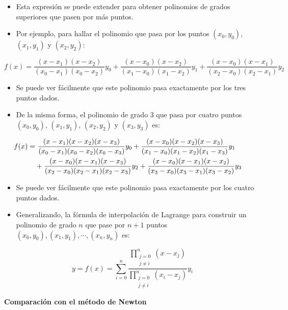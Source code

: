 \documentclass[openany]{book}
\providecommand{\tightlist}{%
  \setlength{\itemsep}{0pt}\setlength{\parskip}{0pt}}
\begin{document}
\begin{itemize}
\tightlist
\item
  Esta expresión se puede extender para obtener polinomios de grados superiores que pasen por más puntos.
\item
  Por ejemplo, para hallar el polinomio que pasa por los puntos \((x_0, y_0)\), \((x_1, y_1)\) y \((x_2, y_2)\):
\end{itemize}

\[
f(x) = \frac{(x - x_1)(x - x_2)}{(x_0 - x_1)(x_0 - x_2)} y_0 + \frac{(x - x_0)(x - x_2)}{(x_1 - x_0)(x_1 - x_2)} y_1 + \frac{(x - x_0)(x - x_1)}{(x_2 - x_0)(x_2 - x_1)} y_2
\]

\begin{itemize}
\item
  Se puede ver fácilmente que este polinomio pasa exactamente por los tres puntos dados.
\item
  De la misma forma, el polinomio de grado 3 que pasa por cuatro puntos \((x_0, y_0)\), \((x_1, y_1)\), \((x_2, y_2)\) y \((x_3, y_3)\) es:
\end{itemize}

\[
\hspace{-0.5cm}
\begin{split}
f(x) = &~ \frac{(x - x_1)(x - x_2)(x - x_3)}{(x_0 - x_1)(x_0 - x_2)(x_0 - x_3)} y_0 + \frac{(x - x_0)(x - x_2)(x - x_3)}{(x_1 - x_0)(x_1 - x_2)(x_1 - x_3)} y_1 \\
& + \frac{(x - x_0)(x - x_1)(x - x_3)}{(x_2 - x_0)(x_2 - x_1)(x_2 - x_3)} y_2 + \frac{(x - x_0)(x - x_1)(x - x_2)}{(x_3 - x_0)(x_3 - x_1)(x_3 - x_2)} y_3
\end{split}
\]

\begin{itemize}
\item
  Se puede ver fácilmente que este polinomio pasa exactamente por los cuatro puntos dados.
\item
  Generalizando, la fórmula de interpolación de Lagrange para construir un polinomio de grado \(n\) que pase por \(n+1\) puntos \((x_0, y_0), (x_1, y_1), \cdots, (x_n, y_n)\) es:
\end{itemize}

\[
y = f(x) = \sum_{i = 0}^n \frac{\prod\limits_{\substack{j = 0\\ j \neq i}}^n (x - x_j)}{\prod\limits_{\substack{j = 0\\ j \neq i}}^n (x_i - x_j)} y_i
\]

\textbf{Comparación con el método de Newton}
\end{document}
